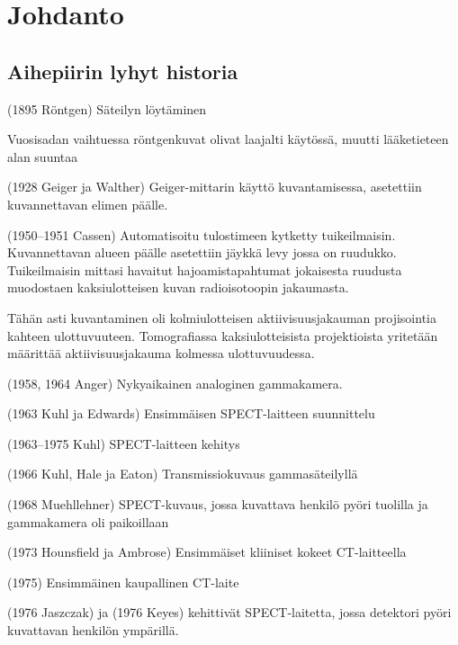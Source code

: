 \section{Johdanto}
\subsection{Aihepiirin lyhyt historia}
(1895 Röntgen) Säteilyn löytäminen\cite{bercovich_medical_2018}

Vuosisadan vaihtuessa röntgenkuvat olivat laajalti käytössä, muutti lääketieteen alan suuntaa\cite{bercovich_medical_2018}

(1928 Geiger ja Walther) Geiger-mittarin käyttö kuvantamisessa, asetettiin kuvannettavan elimen päälle.\cite{jaszczak_early_2006}

(1950--1951 Cassen) Automatisoitu tulostimeen kytketty tuikeilmaisin. Kuvannettavan alueen päälle asetettiin jäykkä levy jossa on ruudukko. Tuikeilmaisin mittasi havaitut hajoamistapahtumat jokaisesta ruudusta muodostaen kaksiulotteisen kuvan radioisotoopin jakaumasta.\cite{jaszczak_early_2006}

Tähän asti kuvantaminen oli kolmiulotteisen aktiivisuusjakauman projisointia kahteen ulottuvuuteen. Tomografiassa kaksiulotteisista projektioista yritetään määrittää aktiivisuusjakauma kolmessa ulottuvuudessa.

(1958, 1964 Anger) Nykyaikainen analoginen gammakamera.\cite{jaszczak_early_2006, hutton_origins_2014}

(1963 Kuhl ja Edwards) Ensimmäisen SPECT-laitteen suunnittelu\cite{jaszczak_early_2006, hutton_origins_2014}

(1963--1975 Kuhl) SPECT-laitteen kehitys\cite{jaszczak_early_2006, hutton_origins_2014}

(1966 Kuhl, Hale ja Eaton) Transmissiokuvaus gammasäteilyllä\cite{jaszczak_early_2006, hutton_origins_2014}

(1968 Muehllehner) SPECT-kuvaus, jossa kuvattava henkilö pyöri tuolilla ja gammakamera oli paikoillaan\cite{jaszczak_early_2006, hutton_origins_2014}

(1973 Hounsfield ja Ambrose) Ensimmäiset kliiniset kokeet CT-laitteella\cite{hutton_origins_2014, bercovich_medical_2018}

(1975) Ensimmäinen kaupallinen CT-laite\cite{hutton_origins_2014}

(1976 Jaszczak) ja (1976 Keyes) kehittivät SPECT-laitetta, jossa detektori pyöri kuvattavan henkilön ympärillä.\cite{jaszczak_early_2006, hutton_origins_2014}


